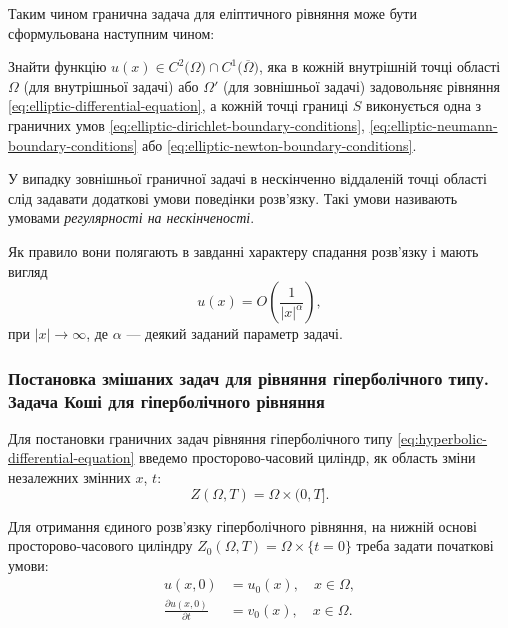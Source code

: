 Таким чином гранична задача для еліптичного рівняння може бути сформульована наступним чином: 
\begin{problem_formulation*}
    Знайти функцію $u(x) \in C^2\big(\Omega\big) \cap C^1 \big( \overline \Omega \big)$, яка в кожній внутрішній точці області $\Omega$ (для внутрішньої задачі) або $\Omega'$ (для зовнішньої задачі) задовольняє рівняння \eqref{eq:elliptic-differential-equation}, а кожній точці границі $S$ виконується одна з граничних умов \eqref{eq:elliptic-dirichlet-boundary-conditions}, \eqref{eq:elliptic-neumann-boundary-conditions} або \eqref{eq:elliptic-newton-boundary-conditions}.
\end{problem_formulation*}

\begin{definition}
    У випадку зовнішньої граничної задачі в нескінченно віддаленій точці області слід задавати додаткові умови поведінки розв'язку. Такі умови називають умовами \textit{регулярності на нескінченості}.
\end{definition}

\begin{remark}
    Як правило вони полягають в завданні характеру спадання розв'язку і мають вигляд
    \begin{equation}
        u(x) = O \left( \frac{1}{|x|^\alpha} \right),
    \end{equation}
    при $|x| \to \infty$, де $\alpha$ --- деякий заданий параметр задачі.
\end{remark}

\subsubsection{Постановка змішаних задач для рівняння гіперболічного типу. Задача Коші для гіперболічного рівняння}

Для постановки граничних задач рівняння гіперболічного типу \eqref{eq:hyperbolic-differential-equation} введемо просторово-часовий циліндр, як область зміни незалежних змінних $x$, $t$:
\begin{equation}
    Z(\Omega, T) = \Omega \times (0, T].
\end{equation}

Для отримання єдиного розв'язку гіперболічного рівняння, на нижній основі просторово-часового циліндру $Z_0(\Omega, T) = \Omega \times \{t = 0\}$ треба задати початкові умови:
\begin{align}
    \label{eq:hyperbolic-starting-function-condition}
    u(x, 0) &= u_0(x), \quad x \in \Omega, \\
    \label{eq:hyperbolic-starting-derivative-condition}
    \frac{\partial u(x, 0)}{\partial t} &= v_0(x), \quad x \in \Omega.
\end{align}

